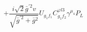 %
\begin{dmath*}
%
  +  \frac{i \sqrt{2} {\bar g}^{\prime 2} v}{\sqrt{{\bar g}^{\prime 2} + {\bar g}{}^2}}U_{g_1 f_1} C^{ \varphi  l3}_{g_1 f_2} \gamma^{\mu_4} P_L
%
\end{dmath*}
%
